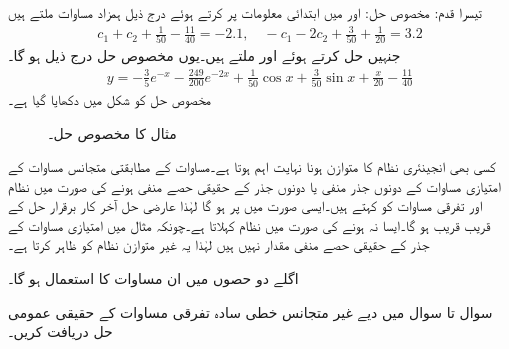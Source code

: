 تیسرا قدم: مخصوص حل:\quad {} اور  میں ابتدائی معلومات پر کرتے ہوئے درج ذیل ہمزاد مساوات ملتے ہیں
\begin{align*}
c_1+c_2+\frac{1}{50}-\frac{11}{40}=-2.1,\quad -c_1-2c_2+\frac{3}{50}+\frac{1}{20}=3.2
\end{align*}
جنہیں حل کرتے ہوئے  اور  ملتے ہیں۔یوں مخصوص حل درج ذیل ہو گا۔
\begin{align*}
y=-\frac{3}{5}e^{-x}-\frac{249}{200}e^{-2x}+\tfrac{1}{50}\cos x+\tfrac{3}{50}\sin x+\tfrac{x}{20}-\frac{11}{40}
\end{align*}
مخصوص حل کو شکل  میں دکھایا گیا ہے۔
\begin{figure}
\centering
{}
\caption{مثال  کا مخصوص حل۔}
\label{شکل_مثال_سادہ_دو_نا_معلوم_سر_پ}
\end{figure}

کسی بھی انجینئری نظام کا متوازن ہونا نہایت اہم ہوتا ہے۔مساوات   کے مطابقتی متجانس مساوات کے امتیازی مساوات کے دونوں جذر منفی یا دونوں جذر کے حقیقی حصے منفی ہونے کی صورت میں نظام اور تفرقی مساوات کو  کہتے ہیں۔ایسی صورت میں  پر  ہو گا لہٰذا عارضی حل  آخر کار برقرار حل  کے قریب  قریب ہو گا۔ایسا نہ ہونے کی صورت میں نظام  کہلاتا ہے۔چونکہ مثال  میں امتیازی مساوات کے جذر کے حقیقی حصے منفی مقدار نہیں ہیں لہٰذا یہ غیر متوازن نظام کو ظاہر کرتا ہے۔

اگلے دو حصوں میں ان مساوات کا استعمال ہو گا۔



سوال  تا سوال  میں دیے غیر متجانس خطی سادہ تفرقی مساوات کے حقیقی عمومی حل دریافت کریں۔

